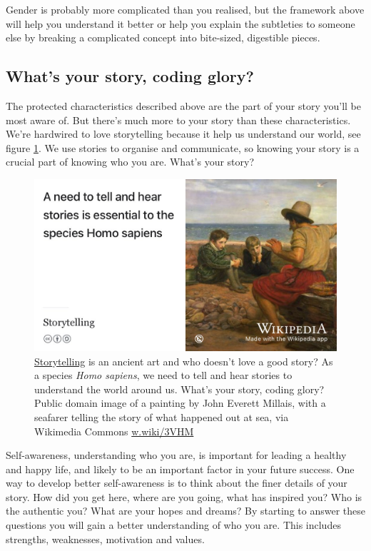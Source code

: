 \documentclass[
]{book}
\begin{document}
Gender is probably more complicated than you realised, but the framework above will help you understand it better or help you explain the subtleties to someone else by breaking a complicated concept into bite-sized, digestible pieces.

\hypertarget{story}{%
\subsection{What's your story, coding glory?}\label{story}}

The protected characteristics described above are the part of your story you'll be most aware of. But there's much more to your story than these characteristics. We're hardwired to love storytelling because it help us understand our world, see figure \ref{fig:storytelling-fig}. We use stories to organise and communicate, so knowing your story is a crucial part of knowing who you are. What's your story?

\begin{figure}

{\centering \includegraphics[width=1\linewidth]{images/storytelling} 

}

\caption{\href{https://en.wikipedia.org/wiki/Storytelling}{Storytelling} is an ancient art and who doesn't love a good story? As a species \emph{Homo sapiens}, we need to tell and hear stories to understand the world around us. What's your story, coding glory? Public domain image of a painting by John Everett Millais, with a seafarer telling the story of what happened out at sea, via Wikimedia Commons \href{https://w.wiki/3VHM}{w.wiki/3VHM}}\label{fig:storytelling-fig}
\end{figure}



Self-awareness, understanding who you are, is important for leading a healthy and happy life, and likely to be an important factor in your future success. One way to develop better self-awareness is to think about the finer details of your story. \citep{freeyourstory} How did you get here, where are you going, what has inspired you? Who is the authentic you? \citep{regrets} What are your hopes and dreams? By starting to answer these questions you will gain a better understanding of who you are. This includes strengths, weaknesses, motivation and values. \citep{parachute2020}
\end{document}
